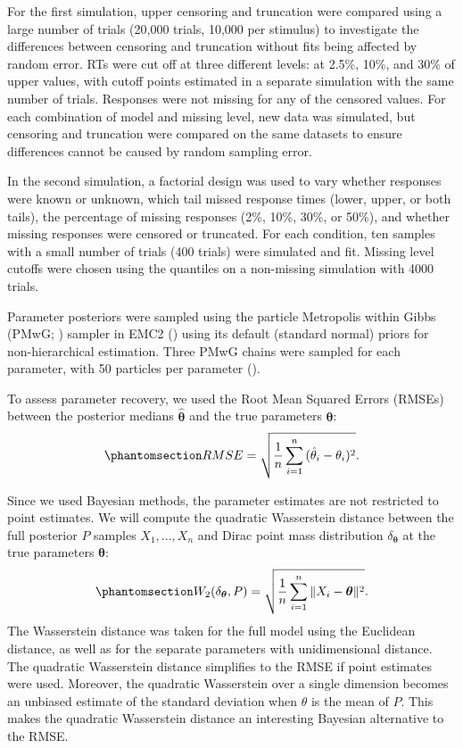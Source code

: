 \documentclass[
  stu,
  floatsintext,
  longtable,
  nolmodern,
  notxfonts,
  notimes,
  draftfirst,
  colorlinks=true,linkcolor=blue,citecolor=blue,urlcolor=blue]{apa7}
\begin{document}
For the first simulation, upper censoring and truncation were compared
using a large number of trials (20,000 trials, 10,000 per stimulus) to
investigate the differences between censoring and truncation without
fits being affected by random error. RTs were cut off at three different
levels: at 2.5\%, 10\%, and 30\% of upper values, with cutoff points
estimated in a separate simulation with the same number of trials.
Responses were not missing for any of the censored values. For each
combination of model and missing level, new data was simulated, but
censoring and truncation were compared on the same datasets to ensure
differences cannot be caused by random sampling error.

In the second simulation, a factorial design was used to vary whether
responses were known or unknown, which tail missed response times
(lower, upper, or both tails), the percentage of missing responses (2\%,
10\%, 30\%, or 50\%), and whether missing responses were censored or
truncated. For each condition, ten samples with a small number of trials
(400 trials) were simulated and fit. Missing level cutoffs were chosen
using the quantiles on a non-missing simulation with 4000 trials.

Parameter posteriors were sampled using the particle Metropolis within
Gibbs (PMwG; ) sampler in EMC2
() using its default
(standard normal) priors for non-hierarchical estimation. Three PMwG
chains were sampled for each parameter, with 50 particles per parameter
().

To assess parameter recovery, we used the Root Mean Squared Errors
(RMSEs) between the posterior medians \(\boldsymbol{\hat{\theta}}\) and
the true parameters \(\boldsymbol{\theta}\):
\begin{equation}\phantomsection\label{eq-RMSE}{
RMSE = \sqrt{\frac{1}{n}\sum_{i=1}^{n}{(\hat{\theta}_i - \theta_i)^2}}.
}\end{equation}

Since we used Bayesian methods, the parameter estimates are not
restricted to point estimates. We will compute the quadratic Wasserstein
distance between the full posterior \(P\) samples \(X_1,...,X_n\) and
Dirac point mass distribution \(\delta_{\boldsymbol{\theta}}\) at the
true parameters \(\boldsymbol{\theta}\):
\begin{equation}\phantomsection\label{eq-Wasserstein}{
W_2(\delta_{\boldsymbol{\theta}}, P) = \sqrt{\frac{1}{n} \sum_{i=1}^{n}{\|X_i - \boldsymbol{\theta}\|^2}}.
}\end{equation} The Wasserstein distance was taken for the full model
using the Euclidean distance, as well as for the separate parameters
with unidimensional distance. The quadratic Wasserstein distance
simplifies to the RMSE if point estimates were used. Moreover, the
quadratic Wasserstein over a single dimension becomes an unbiased
estimate of the standard deviation when \(\theta\) is the mean of \(P\).
This makes the quadratic Wasserstein distance an interesting Bayesian
alternative to the RMSE.
\end{document}
